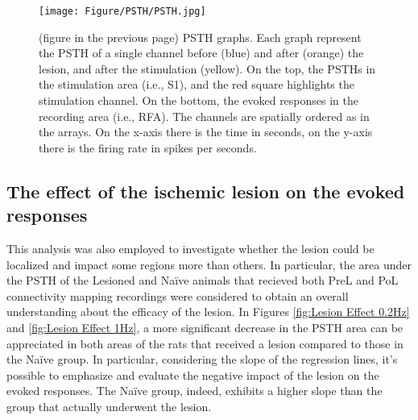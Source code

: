 \begin{figure}[htp]
    \begin{center}
    \texttt{[image: Figure/PSTH/PSTH.jpg]}
    \end{center}
\end{figure}
\begin{figure}[p!]
    \caption{(figure in the previous page) PSTH graphs. Each graph represent the PSTH of a single channel before (blue) and after (orange) the lesion, and after the stimulation (yellow). On the top, the PSTHs in the stimulation area (i.e., S1), and the red square highlights the stimulation channel. On the bottom, the evoked responses in the recording area (i.e., RFA). The channels are spatially ordered as in the arrays. On the x-axis there is the time in seconds, on the y-axis there is the firing rate in spikes per seconds.}
    \label{fig:PSTH}
\end{figure}
\clearpage

\subsection{The effect of the ischemic lesion on the evoked responses}

This analysis was also employed to investigate whether the lesion could be localized and impact some regions more than others. In particular, the area under the PSTH of the Lesioned and Naïve animals that recieved both PreL and PoL connectivity mapping recordings were considered to obtain an overall understanding about the efficacy of the lesion. In Figures \ref{fig:Lesion Effect 0.2Hz} and \ref{fig:Lesion Effect 1Hz}, a more significant decrease in the PSTH area can be appreciated in both areas of the rats that received a lesion compared to those in the Naïve group. In particular, considering the slope of the regression lines, it’s possible to emphasize and evaluate the negative impact of the lesion on the evoked responses. The Naïve group, indeed, exhibits a higher slope than the group that actually underwent the lesion.

